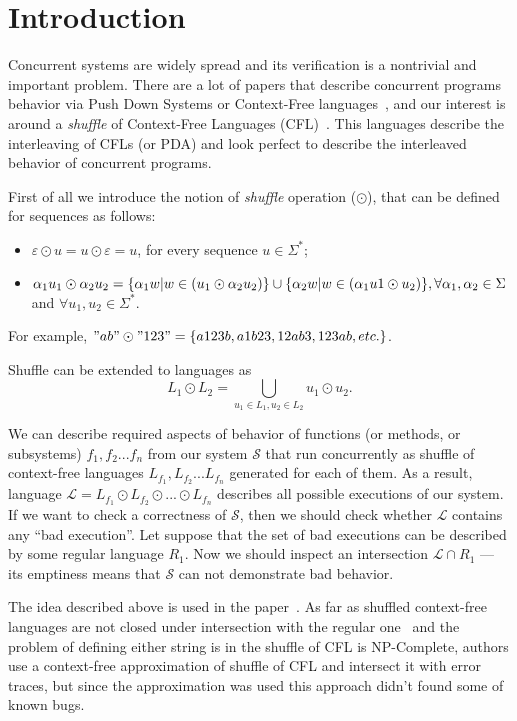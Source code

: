 \section{Introduction}

Concurrent systems are widely spread and its verification is a nontrivial and important problem.
There are a lot of papers that describe concurrent programs behavior via Push Down Systems or Context-Free languages~\cite{gange2015tool, bouajjani2003generic, chaki2006verifying, ModelPDA1}, and our interest is around a \textit{shuffle} of Context-Free Languages (CFL)~\cite{CFLShuffle}.
This languages describe the interleaving of CFLs (or PDA) and look perfect to describe the interleaved behavior of concurrent programs.

First of all we introduce the notion of \textit{shuffle} operation ($\odot$), that can be defined for sequences as follows:
\begin{itemize}
    \item $\varepsilon \odot u = u \odot \varepsilon = {u}$, for every sequence $ u \in \Sigma^*$;
    \item $\alpha_1 u_1 \odot \alpha_2 u_2 = \{\alpha_1 w | w \in (u_1 \odot \alpha_2 u_2) \} \cup \newline
    \{\alpha_2 w | w \in (\alpha_1 u1 \odot u_2 ) \},  \forall \alpha_1, \alpha_2 \in \Sigma$ and $\forall u_1, u_2 \in \Sigma^*$.
\end{itemize}
For example, $"ab" \odot "123" = \{a123b,a1b23, 12ab3, 123ab, etc.\}$.

Shuffle can be extended to languages as $$L_1 \odot L_2 = \bigcup\limits_{u_1\in L_1, u_2\in L_2} u_1 \odot u_2.$$

We can describe required aspects of behavior of functions (or methods, or subsystems) $f_1, f_2 ... f_n$ from our system $\mathcal{S}$ that run concurrently as shuffle of context-free languages $L_{f_1}, L_{f_2} ... L_{f_n}$ generated for each of them.
As a result, language  $\mathcal{L} = L_{f_1} \odot L_{f_2} \odot... \odot L_{f_n}$ describes all possible executions of our system.
If we want to check a correctness of $\mathcal{S}$, then we should check whether $\mathcal{L}$ contains any ``bad execution''.
Let suppose that the set of bad executions can be described by some regular language $R_1$.
Now we should inspect an intersection $\mathcal{L} \cap R_1$ --- its emptiness means that $\mathcal{S}$ can not demonstrate bad behavior.

The idea described above is used in the paper~\cite{stenman2011approximating}. 
As far as shuffled context-free languages are not closed under intersection with the regular one~\cite{CFLShuffle} and the problem of defining either string is in the shuffle of CFL is NP-Complete,
 authors use a context-free approximation of shuffle of CFL and intersect it with error traces, but since the approximation was used this approach didn't found some of known bugs. 

